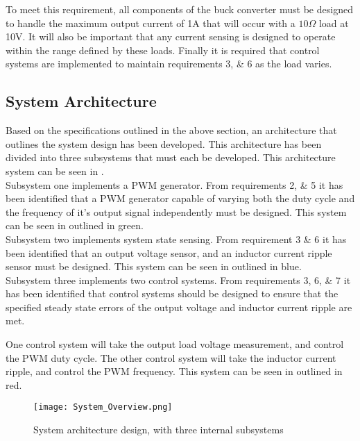 To meet this requirement, all components of the buck converter must be designed to handle the maximum output current of 1A that will occur with a $10\Omega$ load at 10V. It will also be important that any current sensing is designed to operate within the range defined by these loads. Finally it is required that control systems are implemented to maintain requirements 3, \& 6 as the load varies. 

\subsection{System Architecture}

Based on the specifications outlined in the above section, an architecture that outlines the system design has been developed. This architecture has been divided into three subsystems that must each be developed. This architecture system can be seen in .\\

Subsystem one implements a PWM generator. From requirements 2, \& 5 it has been identified that a PWM generator capable of varying both the duty cycle and the frequency of it's output signal independently must be designed. This system can be seen in  outlined in green.\\

Subsystem two implements system state sensing. From requirement 3 \& 6 it has been identified that an output voltage sensor, and an inductor current ripple sensor must be designed. This system can be seen in  outlined in blue.\\

Subsystem three implements two control systems. From requirements 3, 6, \& 7 it has been identified that control systems should be designed to ensure that the specified steady state errors of the output voltage and inductor current ripple are met. 

One control system will take the output load voltage measurement, and control the PWM duty cycle. The other control system will take the inductor current ripple, and control the PWM frequency. This system can be seen in  outlined in red.

\newpage

\begin{figure}[!h]
    \texttt{[image: System\_Overview.png]}
    \caption{System architecture design, with three internal subsystems}
    \label{F:sys_overview}
\end{figure}


